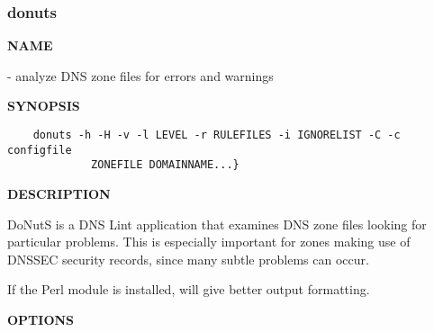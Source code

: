 \clearpage

\subsubsection{\bf donuts}


{\bf NAME}

 - analyze DNS zone files for errors and warnings

{\bf SYNOPSIS}

\begin{verbatim}
    donuts -h -H -v -l LEVEL -r RULEFILES -i IGNORELIST -C -c configfile
        	 ZONEFILE DOMAINNAME...}
\end{verbatim}

{\bf DESCRIPTION}

DoNutS is a DNS Lint application that examines DNS zone files looking for
particular problems.  This is especially important for zones making use of
DNSSEC security records, since many subtle problems can occur.

If the  Perl module is installed,  will give
better output formatting.

{\bf OPTIONS}

